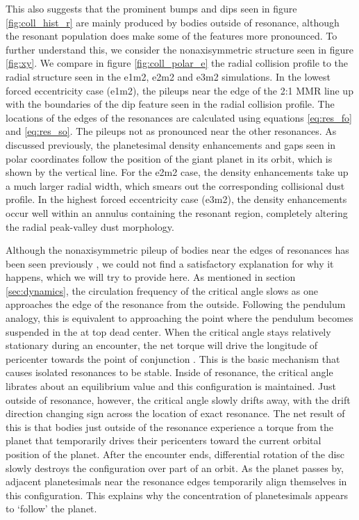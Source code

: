 \documentclass[fleqn,usenatbib]{mnras}
\begin{document}
This also suggests that the prominent bumps and dips seen in figure \ref{fig:coll_hist_r} are mainly produced by bodies outside of resonance, although 
the resonant population does make some of the features more pronounced. To further understand this, we consider the nonaxisymmetric structure 
seen in figure \ref{fig:xy}. We compare in figure \ref{fig:coll_polar_e} the radial collision profile to the radial structure seen in the e1m2, e2m2 and 
e3m2 simulations. In the lowest forced eccentricity case (e1m2), the pileups near the edge of the 2:1 MMR line up with the boundaries of the dip 
feature seen in the radial collision profile. The locations of the edges of the resonances are calculated using equations \ref{eq:res_fo} and 
\ref{eq:res_so}. The pileups not as pronounced near the other resonances. As discussed previously, the planetesimal density enhancements and gaps 
seen in polar coordinates follow the position of the giant planet in its orbit, which is shown by the vertical line. For the e2m2 case, the density 
enhancements take up a much larger radial width, which smears out the corresponding collisional dust profile. In the highest forced eccentricity case 
(e3m2), the density enhancements occur well within an annulus containing the resonant region, completely altering the radial peak-valley dust 
morphology.

Although the nonaxisymmetric pileup of bodies near the edges of resonances has been seen previously 
\citep{2000Icar..143...45R, 2016ApJ...818..159T}, we could not find a satisfactory explanation for why it happens, which we will try to provide here. As 
mentioned in section \ref{sec:dynamics}, the circulation frequency of the critical angle slows as one approaches the edge of the resonance from the 
outside. Following the pendulum analogy, this is equivalent to
approaching the point where the pendulum becomes suspended in the
at top dead center. 
When the critical angle stays relatively stationary during an encounter, the net torque will drive the longitude of pericenter towards the point of 
conjunction \citep{1976ARA&A..14..215P}.  This is the basic mechanism that causes isolated resonances to be stable. Inside of resonance, the critical 
angle librates about an equilibrium value and this configuration is maintained. Just outside of resonance, however, the critical angle slowly drifts away, with the 
drift direction changing sign across the location of exact resonance. The net result of this is that bodies just outside of the resonance experience a torque from 
the planet that temporarily drives their pericenters toward the current orbital position of the planet. After the encounter ends, differential rotation of the disc 
slowly destroys the configuration over part of an orbit. As the planet passes by, adjacent planetesimals near the resonance edges temporarily align 
themselves in this configuration. This explains why the concentration of planetesimals appears to `follow' the planet.
\end{document}
